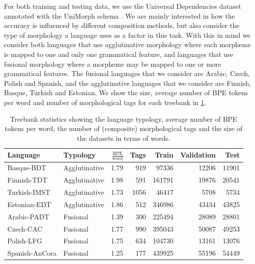 \documentclass[11pt]{article}
\newcommand\citep{\cite}
\begin{document}
            For both training and testing data, we use the Universal
     Dependencies dataset \citep{nivre2018} annotated with the
     UniMorph schema \citep{mccarthy2018marrying}.  We are mainly
     interested in how the accuracy is influenced by different
     composition methods, but also consider the type of morphology a
     language uses as a factor in this task.
%
    With this in mind we consider both
     languages that use agglutinative morphology where each morpheme
     is mapped to one and only one grammatical feature, and
     languages that use fusional morphology where a morpheme may be
     mapped to one or more grammatical features. 
%
%
           	The fusional languages that we consider are Arabic, Czech,
     Polish and Spanish, and the agglutinative languages that we
     consider are Finnish, Basque, Turkish and Estonian.  We show the
     size, average number of BPE tokens per word and number of
     morphological tags for each treebank in \cref{tab:data}.
    
    
    \begin{table}
		\centering
		\begin{tabular}{l|lrrrrr}
			Language & Typology & $\frac{\textrm{BPE}}{\textrm{word}}$ & Tags & Train & Validation & Test \\
			\hline
			Basque-BDT      & Agglutinative & 1.79 & 919 & 97336 & 12206 & 11901 \\
			Finnish-TDT     & Agglutinative & 1.98 & 591 & 161791 & 19876 & 20541 \\
			Turkish-IMST    & Agglutinative & 1.73 & 1056 & 46417 & 5708 & 5734 \\
			Estonian-EDT    & Agglutinative & 1.86 & 512 & 346986 & 43434 & 43825 \\
            Arabic-PADT     & Fusional & 1.39 & 300 & 225494 & 28089 & 28801  \\
			Czech-CAC       & Fusional & 1.77 & 990 & 395043 & 50087 & 49253 \\
			Polish-LFG      & Fusional & 1.75 & 634 & 104730 & 13161 & 13076 \\
			Spanish-AnCora  & Fusional & 1.25 & 177 & 439925 & 55196 & 54449 \\
        \end{tabular}
    		\caption{\label{tab:data} Treebank statistics showing the
     language typology, average number of BPE tokens per word, the
     number of (composite) morphological tags and the size of the datasets in
     terms of words.}
	\end{table}
    
\end{document}
